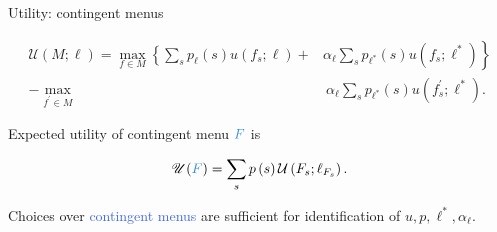 \documentclass[usenames,dvipsnames,aspectratio=169,11pt]{beamer}
\begin{document}
\begin{frame}[noframenumbering]{Utility: contingent menus}


	\[
		\begin{aligned}
			\mathcal{U} \left(M ; \ell \right) = \max _{f \in M}\left\{\sum_{s} p_{\ell} \left( s \right) u \left( f_{s} ; \ell \right) + \right. & \left. \alpha_{\ell} \sum_{s} p_{\ell^{*}} \left( s \right) u \left( f_{s} ; \ell^{*} \right) \right\} \\
			-\max _{f^{\prime} \in M}                                                                                                             & \: \alpha _{\ell} \sum_{s} p_{\ell^{*}} \left( s \right) u\left(f^{\prime}_{s} ; \ell^{*} \right) .
		\end{aligned}
	\]

	Expected utility of contingent menu \( \textcolor{RoyalBlue}{F} \) is

	\vfill
	\[
		\mathscr{U}(\textcolor{RoyalBlue}{F})= \sum_{s} p \left( s \right) \mathcal{U} \left(F_{s} ; \ell_{F_s} \right) .
	\]

	\vfill

	Choices over \textcolor{RoyalBlue}{contingent menus} are sufficient for identification of \( u, p, \ell^{*}, \alpha_{\ell} \).

\end{frame}
\end{document}
